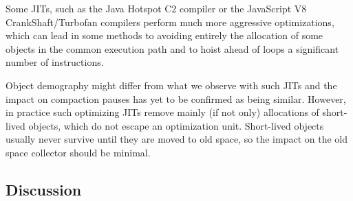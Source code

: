 \documentclass[sigplan,10pt,review,anonymous]{acmart}\settopmatter{printfolios=true,printccs=false,printacmref=false}
\newcommand{\eem}[1]{\color{olive}\fbox{\bfseries\sffamily\scriptsize Eliot:}{\sf\small$\blacktriangleright$\textit{#1}$\blacktriangleleft$}\color{black}}
\def\OpenSmalltalkVM{OpenSmalltalk-VM\xspace}
\begin{document}
Some JITs, such as the Java Hotspot C2 compiler or the JavaScript V8 CrankShaft/Turbofan compilers perform much more aggressive optimizations, which can lead in some methods to avoiding entirely the allocation of some objects in the common execution path and to hoist ahead of loops a significant number of instructions.

Object demography might differ from what we observe with such JITs and the impact on compaction pauses has yet to be confirmed as being similar. However, in practice such optimizing JITs remove mainly (if not only) allocations of short-lived objects, which do not escape an optimization unit. Short-lived objects usually never survive until they are moved to old space, so the impact on the old space collector should be minimal. 


%

\subsection{Discussion}
\label{sec:discussion}
\end{document}
